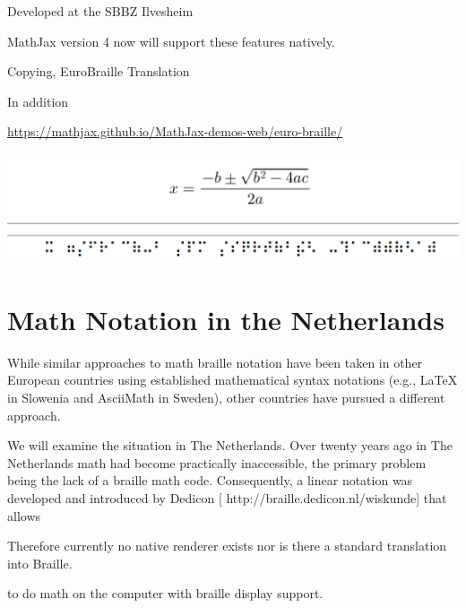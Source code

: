 \documentclass{article}
\begin{document}
Developed at the SBBZ Ilvesheim

MathJax version 4 now will support these features natively.

Copying, EuroBraille Translation 

In addition 

\url{https://mathjax.github.io/MathJax-demos-web/euro-braille/}

\includegraphics[width=.8\textwidth]{quadratic.png}

\section{Math Notation in the Netherlands}\label{sec:math-netherlands}

While similar approaches to math braille notation have been taken in other
European countries using established mathematical syntax notations (e.g.,
{\LaTeX} in Slowenia and AsciiMath in Sweden), other countries have pursued a
different approach.

We will examine the situation in The Netherlands. Over twenty years ago in The
Netherlands math had become practically inaccessible, the primary problem being
the lack of a braille math code. Consequently, a linear notation was developed
and introduced by Dedicon [ http://braille.dedicon.nl/wiskunde] that allows

Therefore currently no native renderer exists nor is there a standard
translation into Braille.

to do math on the computer
with braille display support.




\end{document}
